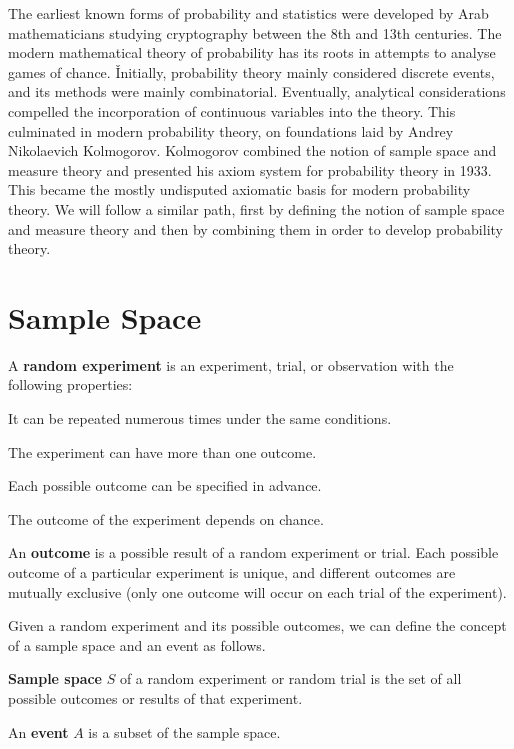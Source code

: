 The earliest known forms of probability and statistics were developed by Arab mathematicians studying cryptography 
between the 8th and 13th centuries. The modern mathematical theory of probability has its roots in attempts to 
analyse games of chance. \v

Initially, probability theory mainly considered discrete events, and its methods were mainly combinatorial.
Eventually, analytical considerations compelled the incorporation of continuous variables into the theory. This
culminated in modern probability theory, on foundations laid by Andrey Nikolaevich Kolmogorov. Kolmogorov combined
the notion of sample space and measure theory and presented his axiom system for probability theory in 1933. This
became the mostly undisputed axiomatic basis for modern probability theory. We will follow a similar path, first by
defining the notion of sample space and measure theory and then by combining them in order to develop probability
theory.

\section{Sample Space}

A \textbf{random experiment} is an experiment, trial, or observation with the following properties:
\bit
\item It can be repeated numerous times under the same conditions.
\item The experiment can have more than one outcome.
\item Each possible outcome can be specified in advance.
\item The outcome of the experiment depends on chance.
\eit
\ed

\bd[Outcome]
An \textbf{outcome} is a possible result of a random experiment or trial. Each possible outcome of a particular 
experiment is unique, and different outcomes are mutually exclusive (only one outcome will occur on each trial of the
experiment). 
\ed

Given a random experiment and its possible outcomes, we can define the concept of a sample space and an event as 
follows.

\textbf{Sample space} $S$ of a random experiment or random trial is the set of all possible outcomes or results of that 
experiment.
\ed

\bd[Event]
An \textbf{event} $A$ is a subset of the sample space.
\ed


